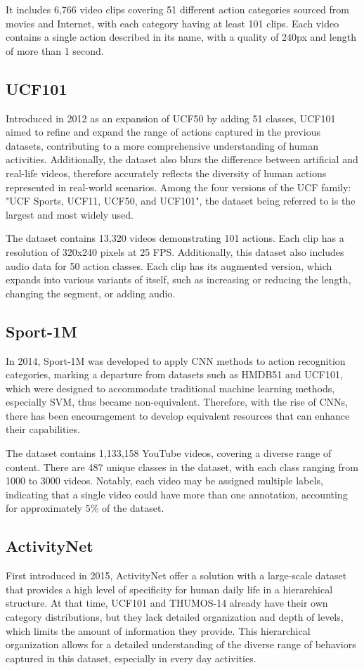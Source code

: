\documentclass[a4paper]{article}
\begin{document}
It includes 6,766 video clips covering 51 different action categories sourced from movies and Internet, with each category having at least 101 clips. Each video contains a single action described in its name, with a quality of 240px and length of more than 1 second.
\subsection{UCF101}
Introduced in 2012 as an expansion of UCF50 by adding 51 classes, UCF101 aimed to refine and expand the range of actions captured in the previous datasets, contributing to a more comprehensive understanding of human activities. Additionally, the dataset also blurs the difference between artificial and real-life videos, therefore accurately reflects the diversity of human actions represented in real-world scenarios. Among the four versions of the UCF family: "UCF Sports, UCF11, UCF50, and UCF101", the dataset being referred to is the largest and most widely used.

The dataset contains 13,320 videos demonstrating 101 actions. Each clip has a resolution of 320x240 pixels at 25 FPS. Additionally, this dataset also includes audio data for 50 action classes. Each clip has its augmented version, which expands into various variants of itself, such as increasing or reducing the length, changing the segment, or adding audio.
\subsection{Sport-1M}
In 2014, Sport-1M was developed to apply CNN methods to action recognition categories, marking a departure from datasets such as HMDB51 and UCF101, which were designed to accommodate traditional machine learning methods, especially SVM, thus became non-equivalent. Therefore, with the rise of CNNs, there has been encouragement to develop equivalent resources that can enhance their capabilities.

The dataset contains 1,133,158 YouTube videos, covering a diverse range of content. There are 487 unique classes in the dataset, with each class ranging from 1000 to 3000 videos. Notably, each video may be assigned multiple labels, indicating that a single video could have more than one annotation, accounting for approximately 5\% of the dataset.
\subsection{ActivityNet}
First introduced in 2015, ActivityNet offer a solution with a large-scale dataset that provides a high level of specificity for human daily life in a hierarchical structure. At that time, UCF101 and THUMOS-14 already have their own category distributions, but they lack detailed organization and depth of levels, which limits the amount of information they provide. This hierarchical organization allows for a detailed understanding of the diverse range of behaviors captured in this dataset, especially in every day activities.
\end{document}
